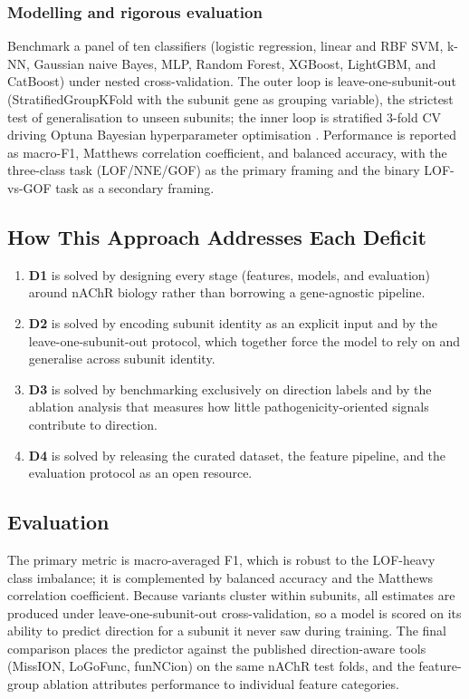 \documentclass[rnd]{mas_proposal}
\begin{document}
\subsubsection{Modelling and rigorous evaluation}
Benchmark a panel of ten classifiers (logistic regression, linear and RBF SVM,
k-NN, Gaussian naive Bayes, MLP, Random Forest, XGBoost, LightGBM, and
CatBoost) under nested cross-validation. The outer loop is
leave-one-subunit-out (StratifiedGroupKFold with the subunit gene as grouping
variable), the strictest test of generalisation to unseen subunits; the inner
loop is stratified 3-fold CV driving Optuna Bayesian hyperparameter
optimisation \cite{optuna}. Performance is reported as macro-F1, Matthews
correlation coefficient, and balanced accuracy, with the three-class task
(LOF/NNE/GOF) as the primary framing and the binary LOF-vs-GOF task as a
secondary framing.

\subsection{How This Approach Addresses Each Deficit}
\begin{enumerate}
    \item \textbf{D1} is solved by designing every stage (features, models, and
    evaluation) around nAChR biology rather than borrowing a gene-agnostic
    pipeline.
    \item \textbf{D2} is solved by encoding subunit identity as an explicit
    input and by the leave-one-subunit-out protocol, which together force the
    model to rely on and generalise across subunit identity.
    \item \textbf{D3} is solved by benchmarking exclusively on direction labels
    and by the ablation analysis that measures how little pathogenicity-oriented
    signals contribute to direction.
    \item \textbf{D4} is solved by releasing the curated dataset, the feature
    pipeline, and the evaluation protocol as an open resource.
\end{enumerate}

\subsection{Evaluation}
The primary metric is macro-averaged F1, which is robust to the LOF-heavy
class imbalance; it is complemented by balanced accuracy and the Matthews
correlation coefficient. Because variants cluster within subunits, all
estimates are produced under leave-one-subunit-out cross-validation, so a model
is scored on its ability to predict direction for a subunit it never saw during
training. The final comparison places the predictor against the published
direction-aware tools (MissION, LoGoFunc, funNCion) on the same nAChR test
folds, and the feature-group ablation attributes performance to individual
feature categories.
\end{document}
